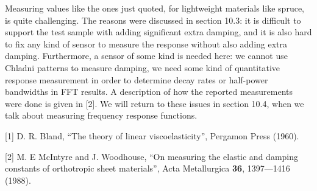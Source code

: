   Measuring values like the ones just quoted, for lightweight materials like 
  spruce, is quite challenging. The reasons were discussed in section 10.3: it 
  is difficult to support the test sample with adding significant extra 
  damping, and it is also hard to fix any kind of sensor to measure the 
  response without also adding extra damping. Furthermore, a sensor of some 
  kind is needed here: we cannot use Chladni patterns to measure damping, we 
  need some kind of quantitative response measurement in order to determine 
  decay rates or half-power bandwidths in FFT results. A description of how the 
  reported measurements were done is given in [2]. We will return to these 
  issues in section 10.4, when we talk about measuring frequency response 
  functions. 

  \sectionreferences{}[1] D. R. Bland, “The theory of linear viscoelasticity”, 
  Pergamon Press (1960). 

  [2] M. E McIntyre and J. Woodhouse, “On measuring the elastic and damping 
  constants of orthotropic sheet materials”, Acta Metallurgica \textbf{36}, 
  1397—1416 (1988). 